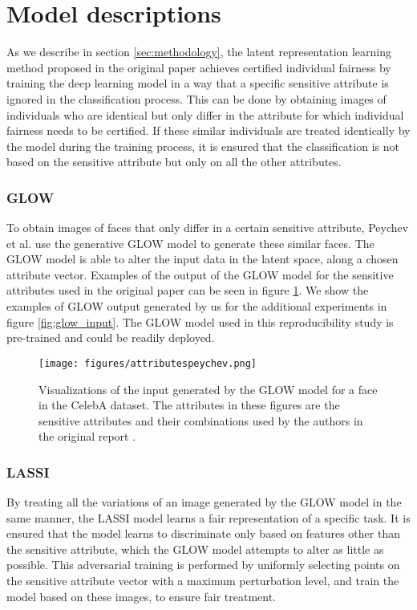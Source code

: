\newpage
\appendix
\section{Model descriptions}
\label{subsec: appendix_1}

As we describe in section \ref{sec:methodology}, the latent representation learning method proposed in the original paper achieves certified individual fairness by training the deep learning model in a way that a specific sensitive attribute is ignored in the classification process. This can be done by obtaining images of individuals who are identical but only differ in the attribute for which individual fairness needs to be certified. If these similar individuals are treated identically by the model during the training process, it is ensured that the classification is not based on the sensitive attribute but only on all the other attributes.

\subsubsection{GLOW} 

To obtain images of faces that only differ in a certain sensitive attribute, Peychev et al. \cite{peychev2022latent} use the generative GLOW model \cite{kingmaglow} to generate these similar faces. The GLOW model is able to alter the input data in the latent space, along a chosen attribute vector. Examples of the output of the GLOW model for the sensitive attributes used in the original paper can be seen in figure \ref{fig:glow_original_output}. We show the examples of GLOW output generated by us for the additional experiments in figure \ref{fig:glow_input}. The GLOW model used in this reproducibility study is pre-trained and could be readily deployed.

\begin{figure}[H]
    \centering
    \texttt{[image: figures/attributespeychev.png]}
    \caption{Visualizations of the input generated by the GLOW model for a face in the CelebA dataset. The attributes in these figures are the sensitive attributes and their combinations used by the authors in the original report \cite{peychev2022latent}.}
    \label{fig:glow_original_output}
\end{figure}

\subsubsection{LASSI} By treating all the variations of an image generated by the GLOW model in the same manner, the LASSI model learns a fair representation of a specific task. It is ensured that the model learns to discriminate only based on features other than the sensitive attribute, which the GLOW model attempts to alter as little as possible. This adversarial training is performed by uniformly selecting points on the sensitive attribute vector with a maximum perturbation level, and train the model based on these images, to ensure fair treatment. \newline

